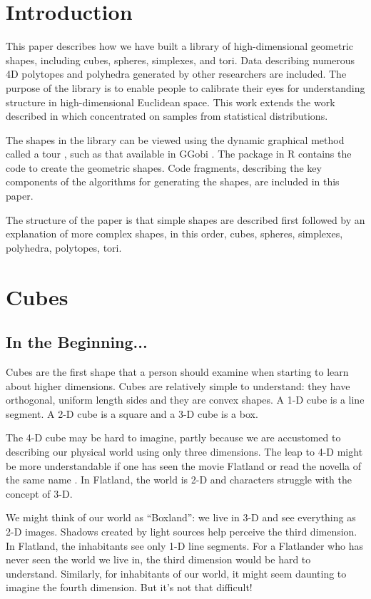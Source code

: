 \documentclass[a4paper]{report}
\begin{document}
\begin{article}
\section{Introduction}

This paper describes how we have built a library of high-dimensional
geometric shapes, including cubes, spheres, simplexes, and tori. Data
describing numerous 4D polytopes and polyhedra generated by other
researchers are included. The purpose of the library is to enable
people to calibrate their eyes for understanding structure in
high-dimensional Euclidean space. This work extends the work described
in \cite{Co97} which concentrated on samples from statistical
distributions.

The shapes in the library can be viewed using the dynamic graphical
method called a tour \citep{AS85}, such as that available in GGobi
\citep{STLBC02}.  The  package in R \citep{R03} contains
the code to create the geometric shapes. Code fragments, describing
the key components of the algorithms for generating the shapes, are
included in this paper.

The structure of the paper is that simple shapes are described first
followed by an explanation of more complex shapes, in this order,
cubes, spheres, simplexes, polyhedra, polytopes, tori.

\section{Cubes}

\subsection{In the Beginning...}

Cubes are the first shape that a person should examine when
starting to learn about higher dimensions. Cubes are relatively simple
to understand: they have orthogonal, uniform length sides and they are
convex shapes. A 1-D cube is a line segment. A 2-D cube is a square and
a 3-D cube is a box. 

The 4-D cube may be hard to imagine, partly because we are accustomed
to describing our physical world using only three dimensions.  The
leap to 4-D might be more understandable if one has seen the movie
Flatland \citep{Ma65} or read the novella of the same name
\citep{Ab1884}. In Flatland, the world is 2-D and characters struggle
with the concept of 3-D.  

We might think of our world as ``Boxland'': we live in 3-D and see
everything as 2-D images. Shadows created by light sources help
perceive the third dimension. In Flatland, the inhabitants see only
1-D line segments. For a Flatlander who has never seen the world we
live in, the third dimension would be hard to understand. Similarly,
for inhabitants of our world, it might seem daunting to imagine the
fourth dimension. But it's not that difficult!


\end{article}
\end{document}
